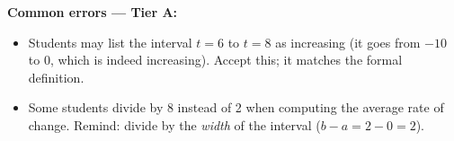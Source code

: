 \documentclass[10pt]{article}
\begin{document}
\begin{teachernote}
\textbf{Common errors --- Tier A:}
\begin{itemize}[leftmargin=1.2em, itemsep=2pt]
  \item Students may list the interval $t=6$ to $t=8$ as increasing (it goes
    from $-10$ to $0$, which is indeed increasing). Accept this; it matches
    the formal definition.
  \item Some students divide by 8 instead of 2 when computing the average rate
    of change. Remind: divide by the \emph{width} of the interval
    ($b - a = 2 - 0 = 2$).
\end{itemize}
\end{teachernote}

\vspace{0.08in}

\end{document}
